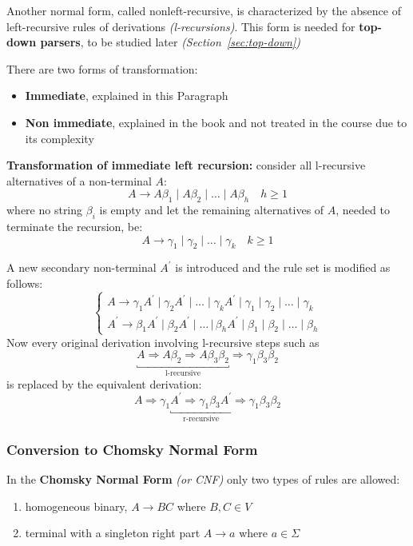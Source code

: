 \documentclass[english]{article}
\begin{document}
Another normal form, called nonleft-recursive, is characterized by the absence of left-recursive rules of derivations \textit{(l-recursions)}.
This form is needed for \textbf{top-down parsers}, to be studied later \textit{(Section~\ref{sec:top-down})}

There are two forms of transformation:
\begin{itemize}
  \item \textbf{Immediate}, explained in this Paragraph
  \item \textbf{Non immediate}, explained in the book and not treated in the course due to its complexity
\end{itemize}

\bigskip
\textbf{Transformation of immediate left recursion:}
consider all l-recursive alternatives of a non-terminal \(A\):
\[ A \rightarrow A \beta_1 \mid A \beta_2 \mid \ldots \mid A \beta_h \quad h \geq 1 \]
where no string \(\beta_i\) is empty and let the remaining alternatives of \(A\), needed to terminate the recursion, be:
\[ A \rightarrow \gamma_1 \mid \gamma_2 \mid \ldots \mid \gamma_k \quad k \geq 1 \]

A new secondary non-terminal \(A^\prime\) is introduced and the rule set is modified as follows:
\[\begin{cases}
    A \rightarrow \gamma_1 A^\prime \mid \gamma_2 A^\prime \mid \ldots \mid \gamma_k A^\prime \mid \gamma_1 \mid \gamma_2 \mid \ldots \mid \gamma_k \\
    A^\prime \rightarrow \beta_1 A^\prime \mid \beta_2 A^\prime \mid \ldots \, |\, \beta_h A^\prime \mid \beta_1 \mid \beta_2 \mid \ldots \mid \beta_h
  \end{cases}\]
Now every original derivation involving l-recursive steps such as
\[\underbracket{A \Rightarrow A \beta_2 \Rightarrow A \beta_3 \beta_2}_{\text{l-recursive}} \Rightarrow \gamma_1 \beta_3 \beta_2 \]
is replaced by the equivalent derivation:
\[A \Rightarrow \gamma_1 \underbracket{A^\prime \Rightarrow \gamma_1 \beta_3 A^\prime}_{\text{r-recursive}} \Rightarrow \gamma_1 \beta_3 \beta_2 \]

\subsubsection{Conversion to Chomsky Normal Form}
\label{sec:conversion-to-chomsky-normal-form}

In the \textbf{Chomsky Normal Form} \textit{(or CNF)} only two types of rules are allowed:

\begin{enumerate}
  \item homogeneous binary, \(A \rightarrow BC\) where \(B, C \in V\)
  \item terminal with a singleton right part \(A \rightarrow a\) where \(a \in \Sigma\)
\end{enumerate}
\end{document}
